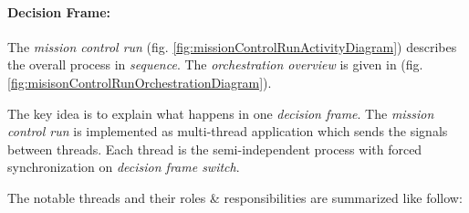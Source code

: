 \paragraph{Decision Frame:} The \emph{mission control run} (fig. \ref{fig:missionControlRunActivityDiagram}) describes the overall process in \emph{sequence}. The \emph{orchestration overview} is given in (fig. \ref{fig:misisonControlRunOrchestrationDiagram}).

The key idea is to explain what happens in one \emph{decision frame}. The \emph{mission control run} is implemented as multi-thread application which sends the signals between threads. Each thread is the semi-independent process with forced synchronization on \emph{decision frame switch}.

\noindent The notable threads and their roles \& responsibilities are summarized like follow:
